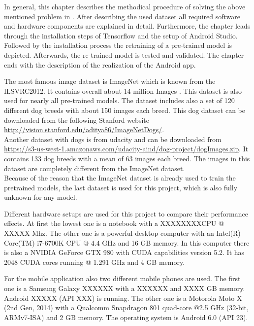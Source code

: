 In general, this chapter describes the methodical procedure of solving the above mentioned problem in . After describing the used dataset all required software and hardware components are explained in detail. Furthermore, the chapter leads through the installation steps of Tensorflow and the setup of Android Studio. Followed by the installation process the retraining of a pre-trained model is depicted. Afterwards, the re-trained model is tested and validated. The chapter ends with the description of the realization of the Android app.

The most famous image dataset is ImageNet which is known from the ILSVRC2012. It contains overall about 14 million Images \citep{ImageNet2010}. This dataset is also used for nearly all pre-trained models. The dataset includes also a set of 120 different dog breeds with about 150 images each breed. This dog dataset can be downloaded from the following Stanford website \url{http://vision.stanford.edu/aditya86/ImageNetDogs/}. \\
Another dataset with dogs is from udacity and can be downloaded from \url{https://s3-us-west-1.amazonaws.com/udacity-aind/dog-project/dogImages.zip}. It contains 133 dog breeds with a mean of 63 images each breed. The images in this dataset are completely different from the ImageNet dataset. \\

Because of the reason that the ImageNet dataset is already used to train the pretrained models, the last dataset is used for this project, which is also fully unknown for any model.

Different hardware setups are used for this project to compare their performance effects.
At first the lowest one is a notebook with a XXXXXXXXCPU @ XXXXX Mhz.
The other one is a powerful desktop computer with an Intel(R) Core(TM) i7-6700K CPU @ 4.4 GHz and 16 GB memory.
In this computer there is also a NVIDIA GeForce GTX 980 with CUDA capabilities version 5.2. It has 2048 CUDA cores running @ 1.291 GHz and 4 GB memory.

For the mobile application also two different mobile phones are used. The first one is a Samsung Galaxy XXXXXX with a XXXXXX and XXXX GB memory. Android XXXXX (API XXX) is running.
The other one is a Motorola Moto X (2nd Gen, 2014) with a Qualcomm Snapdragon 801 quad-core @2.5 GHz (32-bit, ARMv7-ISA) and 2 GB memory. The operating system is Android 6.0 (API 23).

